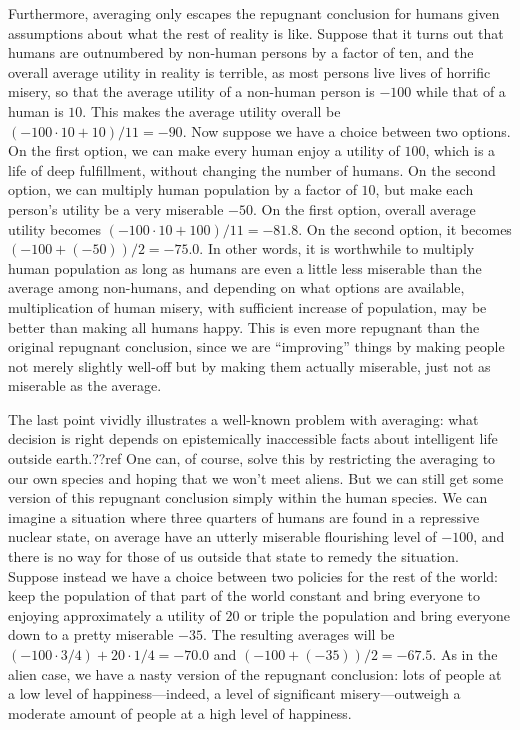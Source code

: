 Furthermore, averaging only escapes the repugnant conclusion for humans given assumptions about what the rest of reality 
is like. Suppose that it turns out that humans are outnumbered by non-human persons by a factor of ten, and the overall average
utility in reality is terrible, as most persons live lives of horrific misery, so that the average utility of a non-human 
person is $-100$ while that of a human is $10$. This makes the average utility overall be $(-100\cdot 10 + 10)/11 = -90$.
Now suppose we have a choice between two options. On the first option, we can make every human enjoy a utility of $100$, which
is a life of deep fulfillment, without changing the number of humans. On the second option, we can multiply human population
by a factor of $10$, but make each person's utility be a very miserable $-50$. On the first option, overall average utility
becomes $(-100\cdot 10 + 100)/11 = -81.8$. On the second option, it becomes $(-100+(-50))/2 = -75.0$. In other words, it is 
worthwhile to multiply human population as long as humans are even a little less miserable than the average among non-humans,
and depending on what options are available, multiplication of human misery, with sufficient increase of population, may be 
better than making all humans happy. This is even more repugnant than the original repugnant conclusion, since we are 
``improving'' things by making people not merely slightly well-off but by making them actually miserable, just not as miserable
as the average.

The last point vividly illustrates a well-known problem with averaging: what decision is right depends on epistemically
inaccessible facts about intelligent life outside earth.??ref One can, of course, solve this by restricting the averaging
to our own species and hoping that we won't meet aliens. But we can still get
some version of this repugnant conclusion simply within the human species. We can imagine a situation where three quarters of humans 
are found in a repressive nuclear state, on average have an utterly miserable flourishing level of $-100$, and there is no way for those of us outside
that state to remedy the situation. Suppose instead we have a choice between two policies for the rest of the world: keep the 
population of that part of the world constant and bring everyone to enjoying approximately a utility of $20$ or triple the population 
and bring  everyone down to a pretty miserable $-35$. The resulting averages will be $(-100\cdot 3/4)+20\cdot 1/4 = -70.0$ and $(-100+(-35))/2 = -67.5$.
As in the alien case, we have a nasty version of the repugnant conclusion: lots of people at a low level of happiness---indeed, a level 
of significant misery---outweigh a moderate amount of people at a high level of happiness. 

